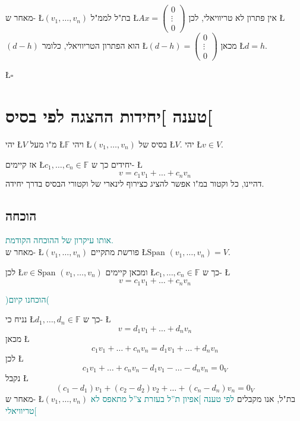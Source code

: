 \documentclass[english,hebrew]{article}
\newcommand{\spn}{\text{Span }}
\begin{document}
מאחר ש- \L{$(v_{1},\dots,v_{n})$} בת"ל לממ"ל \L{$Ax=\begin{pmatrix}0\\
\vdots\\
0
\end{pmatrix}$} אין פתרון לא טריוויאלי, לכן \L{$(d-h)$} הוא הפתרון הטריוויאלי, כלומר
\L{$(d-h)=\begin{pmatrix}0\\
\vdots\\
0
\end{pmatrix}$} מכאן \L{$d=h$}.
\begin{flushright}
\L{$\square$}
\par\end{flushright}

\section{טענה {]}יחידות ההצגה לפי בסיס{[}}

יהי \L{$V$} מ"ו מעל \L{$\mathbb{F}$} ויהי \L{$(v_{1},\dots,v_{n})$}
בסיס של \L{$V$}. יהי \L{$v\in V$}.

אז קיימים \L{$c_{1},\dots,c_{n}\in\mathbb{F}$} יחידים כך ש- \L{%
\[
v=c_{1}v_{1}+\dots+c_{n}v_{n}
\]
}%
דהיינו, כל וקטור במ"ו אפשר להציג כצירוף לינארי של וקטורי הבסיס בדרך
יחידה.

\subsection{הוכחה}

\textcolor{teal}{אותו עיקרון של ההוכחה הקודמת.}\\

מאחר ש- \L{$(v_{1},\dots,v_{n})$} פורשת מתקיים \L{$\spn(v_{1},\dots,v_{n})=V$}.

לכן \L{$v\in\spn(v_{1},\dots,v_{n})$} ומכאן קיימים \L{$c_{1},\dots,c_{n}\in\mathbb{F}$}
כך ש- \L{%
\[
v=c_{1}v_{1}+\dots+c_{n}v_{n}
\]
}%

\textcolor{teal}{)הוכחנו קיום(}

נניח כי \L{$d_{1},\dots,d_{n}\in\mathbb{F}$} כך ש- \L{%
\[
v=d_{1}v_{1}+\dots+d_{n}v_{n}
\]
}%
מכאן \L{%
\[
c_{1}v_{1}+\dots+c_{n}v_{n}=d_{1}v_{1}+\dots+d_{n}v_{n}
\]
}%
לכן \L{%
\[
c_{1}v_{1}+\dots+c_{n}v_{n}-d_{1}v_{1}-\dots-d_{n}v_{n}=0_{V}
\]
}%
נקבל \L{%
\[
(c_{1}-d_{1})v_{1}+(c_{2}-d_{2})v_{2}+\dots+(c_{n}-d_{n})v_{n}=0_{V}
\]
}%
מאחר ש- \L{$(v_{1},\dots,v_{n})$} בת"ל, אנו מקבלים \textcolor{teal}{לפי
טענה {]}אפיון ת\textquotedblright ל בעזרת צ\textquotedblright ל מתאפס
לא טריוויאלי{[}}
\end{document}
